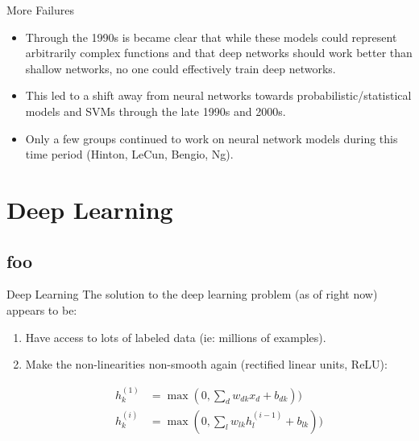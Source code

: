 \documentclass[serif,xcolor=pdftex,dvipsnames,table,hyperref={bookmarks=false}]{beamer}
\begin{document}
\begin{frame}[t]{More Failures}
\begin{itemize}
\setlength{\itemsep}{8pt}

\item Through the 1990s is became clear that while these models could represent arbitrarily complex functions and that deep networks should work better than shallow networks, no one could effectively train deep networks.

\pause\item This led to a shift away from neural networks towards probabilistic/statistical  models and SVMs through the late 1990s and 2000s. 

\pause\item Only a few groups continued to work on neural network models during this time period (Hinton, LeCun, Bengio, Ng).

\end{itemize}
\end{frame}

\section{Deep Learning}
\subsection{foo}

\begin{frame}[t]{Deep Learning}
The solution to the deep learning problem (as of right now) appears to be:

\begin{enumerate}
\setlength{\itemsep}{8pt}

\item Have access to lots of labeled data (ie: millions of examples).

\pause\item Make the non-linearities non-smooth again (rectified linear units, ReLU):

\begin{align}
h^{(1)}_k &= \max(0,\sum_{d}w_{dk}x_d + b_{dk}))\\
h^{(i)}_k &= \max(0,\sum_{l}w_{lk}h^{(i-1)}_l + b_{lk}))
\end{align}

\end{enumerate}
\end{frame}
\end{document}

